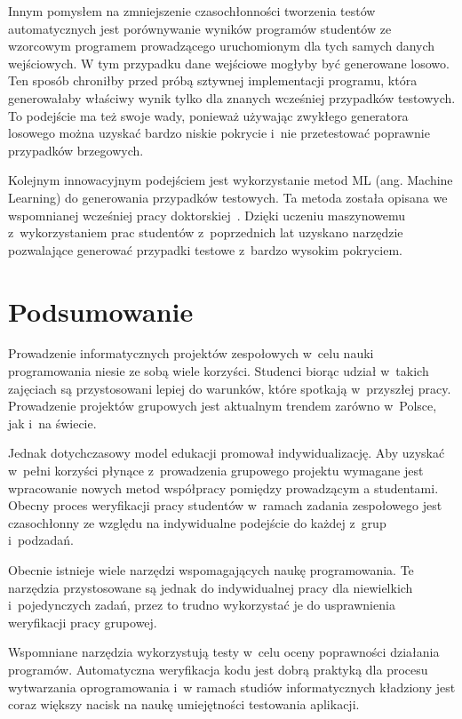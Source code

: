 Innym pomysłem na zmniejszenie czasochłonności tworzenia testów automatycznych jest porównywanie wyników programów studentów ze wzorcowym programem prowadzącego uruchomionym dla tych samych danych wejściowych.
W tym przypadku dane wejściowe mogłyby być generowane losowo.
Ten sposób chroniłby przed próbą sztywnej implementacji programu, która generowałaby właściwy wynik tylko dla znanych wcześniej przypadków testowych.
To podejście ma też swoje wady, ponieważ używając zwykłego generatora losowego można uzyskać bardzo niskie pokrycie i~nie przetestować poprawnie przypadków brzegowych.

Kolejnym innowacyjnym podejściem jest wykorzystanie metod ML (ang. Machine Learning) do generowania przypadków testowych.
Ta metoda została opisana we wspomnianej wcześniej pracy doktorskiej~\cite{teach-testing-thesis}.
Dzięki uczeniu maszynowemu z~wykorzystaniem prac studentów z~poprzednich lat uzyskano narzędzie pozwalające generować przypadki testowe z~bardzo wysokim pokryciem.



\section{Podsumowanie}

Prowadzenie informatycznych projektów zespołowych w~celu nauki programowania niesie ze sobą wiele korzyści.
Studenci biorąc udział w~takich zajęciach są przystosowani lepiej do warunków, które spotkają w~przyszłej pracy.
Prowadzenie projektów grupowych jest aktualnym trendem zarówno w~Polsce, jak i~na świecie.

Jednak dotychczasowy model edukacji promował indywidualizację.
Aby uzyskać w~pełni korzyści płynące z~prowadzenia grupowego projektu wymagane jest wpracowanie nowych metod współpracy pomiędzy prowadzącym a studentami.
Obecny proces weryfikacji pracy studentów w~ramach zadania zespołowego jest czasochłonny ze względu na indywidualne podejście do każdej z~grup i~podzadań.

Obecnie istnieje wiele narzędzi wspomagających naukę programowania.
Te narzędzia przystosowane są jednak do indywidualnej pracy dla niewielkich i~pojedynczych zadań, przez to trudno wykorzystać je do usprawnienia weryfikacji pracy grupowej.

Wspomniane narzędzia wykorzystują testy w~celu oceny poprawności działania programów.
Automatyczna weryfikacja kodu jest dobrą praktyką dla procesu wytwarzania oprogramowania i~w ramach studiów informatycznych kładziony jest coraz większy nacisk na naukę umiejętności testowania aplikacji.

